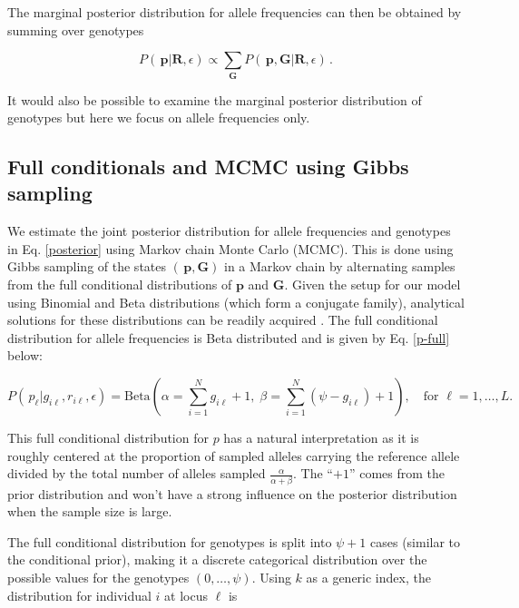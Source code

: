 \documentclass[11pt,english,letterpaper,oneside]{article}
\begin{document}
\noindent The marginal posterior distribution for allele frequencies can then be obtained by summing over genotypes

\begin{equation}\label{marg_post_p}
{P}(\,\bm{p}|\bm{R},\epsilon) \propto \displaystyle\sum_{\bm{G}} {P}(\,\bm{p},\bm{G}|\bm{R},\epsilon)\,.
\end{equation}

\noindent It would also be possible to examine the marginal posterior distribution of genotypes but here we focus on allele frequencies only.

\medskip
\subsection*{Full conditionals and MCMC using Gibbs sampling}
\medskip

\noindent We estimate the joint posterior distribution for allele frequencies and genotypes in Eq. \ref{posterior} using Markov chain Monte Carlo (MCMC). This is done using Gibbs sampling of the states $(\,\bm{p},\bm{G})$ in a Markov chain by alternating samples from the full conditional distributions of $\bm{p}$ and $\bm{G}$. Given the setup for our model using Binomial and Beta distributions (which form a conjugate family), analytical solutions for these distributions can be readily acquired \citep{gelman2014bayesian}. The full conditional distribution for allele frequencies is Beta distributed and is given by Eq. \ref{p-full} below:

\begin{equation}\label{p-full}
{P}(\,p_{\ell}|g_{i \ell},r_{i \ell},\epsilon) = \text{Beta}\left(\alpha= \sum_{i=1}^N g_{i \ell} +1,\; \beta = \sum_{i=1}^N (\psi-g_{i \ell})+1\right),\quad \text{for } \ell = 1,\ldots,L.
\end{equation}

\noindent This full conditional distribution for $p$ has a natural interpretation as it is roughly centered at the proportion of sampled alleles carrying the reference allele divided by the total number of alleles sampled $\frac{\alpha}{\alpha+\beta}$. The ``$+1$'' comes from the prior distribution and won't have a strong influence on the posterior distribution when the sample size is large.

The full conditional distribution for genotypes is split into $\psi+1$ cases (similar to the conditional prior), making it a discrete categorical distribution over the possible values for the genotypes $(0,\ldots,\psi)$. Using $k$ as a generic index, the distribution for individual $i$ at locus $\ell$ is
\end{document}
